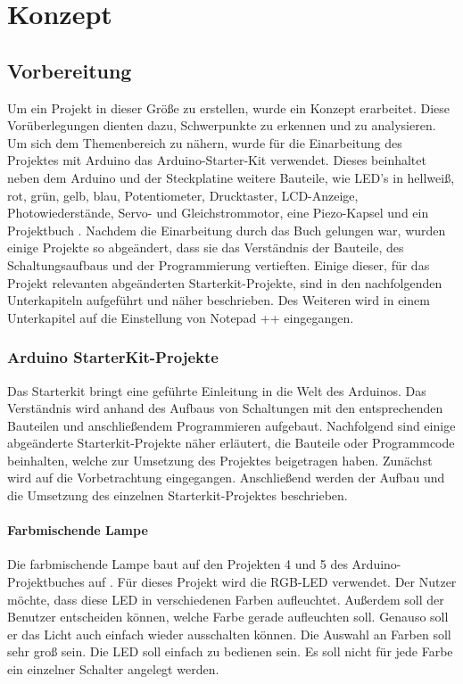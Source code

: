\chapter{Konzept}

\section{Vorbereitung}

Um ein Projekt in dieser Größe zu erstellen, wurde ein Konzept erarbeitet. Diese Vorüberlegungen dienten dazu, Schwerpunkte zu erkennen und zu analysieren. Um sich dem Themenbereich zu nähern, wurde für die Einarbeitung des Projektes mit Arduino das Arduino-Starter-Kit verwendet. Dieses beinhaltet neben dem Arduino und der Steckplatine weitere Bauteile, wie LED’s in hellweiß, rot, grün, gelb, blau, Potentiometer, Drucktaster, LCD-Anzeige, Photowiederstände, Servo- und Gleichstrommotor, eine Piezo-Kapsel und ein Projektbuch \parencite{arduino}. Nachdem die Einarbeitung durch das Buch gelungen war, wurden einige Projekte so abgeändert, dass sie das Verständnis der Bauteile, des Schaltungsaufbaus und der Programmierung vertieften. Einige dieser, für das Projekt relevanten abgeänderten Starterkit-Projekte, sind in den nachfolgenden Unterkapiteln aufgeführt und näher beschrieben. Des Weiteren wird in einem Unterkapitel auf die Einstellung von Notepad ++ eingegangen.


\subsection{Arduino StarterKit-Projekte}

Das Starterkit bringt eine geführte Einleitung in die Welt des Arduinos. Das Verständnis wird anhand des Aufbaus von Schaltungen mit den entsprechenden Bauteilen und anschließendem Programmieren aufgebaut. Nachfolgend sind einige abgeänderte Starterkit-Projekte näher erläutert, die Bauteile oder Programmcode beinhalten, welche zur Umsetzung des Projektes beigetragen haben. Zunächst wird auf die Vorbetrachtung eingegangen. Anschließend werden der Aufbau und die Umsetzung des einzelnen Starterkit-Projektes beschrieben.



\subsubsection{Farbmischende Lampe}

Die farbmischende Lampe baut auf den Projekten 4 und 5 des Arduino-Projektbuches auf \parencite{arduino}. Für dieses Projekt wird die RGB-LED verwendet. Der Nutzer möchte, dass diese LED in verschiedenen Farben aufleuchtet. Außerdem soll der Benutzer entscheiden können, welche Farbe gerade aufleuchten soll. Genauso soll er das Licht auch einfach wieder ausschalten können. Die Auswahl an Farben soll sehr groß sein. Die LED soll einfach zu bedienen sein. Es soll nicht für jede Farbe ein einzelner Schalter angelegt werden.


